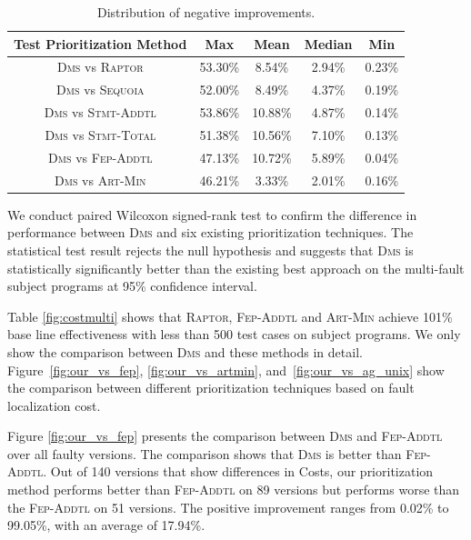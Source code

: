 \begin{table}[!htbp]
    \centering
		\caption{Distribution of negative improvements.}
		\renewcommand{\arraystretch}{1.5}
		\small
        \begin{tabular}{|c|c|c|c|c|}
			\hline
			Test Prioritization Method  &        Max &       Mean &     Median &        Min \\
			\hline\hline
			\textsc{Dms} vs \textsc{Raptor} & {  53.30\%} &     8.54\% &     2.94\% &     0.23\% \\
			\hline
			\textsc{Dms} vs \textsc{Sequoia} & {  52.00\%} &   8.49\% &     4.37\% &     0.19\% \\
			\hline
			\textsc{Dms} vs \textsc{Stmt-Addtl} & {  53.86\%} &    10.88\% &     4.87\% &     0.14\% \\
			\hline
			\textsc{Dms} vs \textsc{Stmt-Total} & { 51.38\%} &   10.56\% &   7.10\% &     0.13\% \\
			\hline
			\textsc{Dms} vs \textsc{Fep-Addtl} & {  47.13\%} &    10.72\% &     5.89\% &     0.04\% \\
			\hline
			\textsc{Dms} vs \textsc{Art-Min} & {  46.21\%} &     3.33\% &     2.01\% &     0.16\% \\
			\hline
		\end{tabular}
    \label{tab:compare_2_neg}
\end{table}

We conduct paired Wilcoxon signed-rank test to confirm the difference in performance between \textsc{Dms} and six existing prioritization techniques. The statistical test result rejects the null hypothesis and suggests that \textsc{Dms} is statistically significantly better than the existing best approach on the multi-fault subject programs at 95\% confidence interval.

\vspace{0.2cm}
Table \ref{fig:costmulti} shows that \textsc{Raptor}, \textsc{Fep-Addtl} and \textsc{Art-Min} achieve 101\% base line effectiveness with less than 500 test cases on subject programs. We only show the comparison between \textsc{Dms} and these methods in detail. Figure~\ref{fig:our_vs_fep}, \ref{fig:our_vs_artmin}, and~\ref{fig:our_vs_ag_unix} show the comparison between different prioritization techniques based on fault localization cost.

\vspace{0.2cm}
Figure \ref{fig:our_vs_fep} presents the comparison between \textsc{Dms} and \textsc{Fep-Addtl} over all faulty versions. The comparison shows that \textsc{Dms} is better than \textsc{Fep-Addtl}. Out of 140 versions that show differences in Costs, our prioritization method performs better than \textsc{Fep-Addtl} on 89 versions but performs worse than the \textsc{Fep-Addtl} on 51 versions. The positive improvement ranges from 0.02\% to 99.05\%, with an average of 17.94\%.

